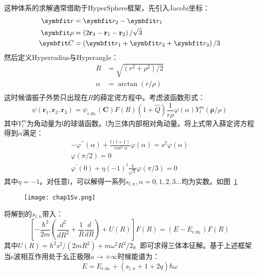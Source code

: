 这种体系的求解通常借助于HyperSphere框架，先引入Jacobi坐标：
\begin{equation}
\begin{split}
\Vector{r}&=\Vector{r}_{2}-\Vector{r}_{1}\\
\boldsymbol{\rho}&=\left(2 \mathbf{r}_{3}-\mathbf{r}_{1}-\mathbf{r}_{2}\right) / \sqrt{3}\\
\Vector{C}&=\left(\Vector{r}_{1}+\Vector{r}_{2}+\Vector{r}_{3}\right) / 3\\
\end{split}
\end{equation}
然后定义Hyperradius与Hyperangle：
\begin{equation}
\begin{split}
R&=\sqrt{\left(r^{2}+\rho^{2}\right) / 2}\\
\alpha&=\arctan (r / \rho)\\
\end{split}
\end{equation}
这时候谐振子外势只出现在$R$的薛定谔方程中。考虑波函数形式：
\begin{equation}
\psi\left(\mathbf{r}_{1}, \mathbf{r}_{2}, \mathbf{r}_{3}\right)=\psi_{\mathrm{c} . \mathrm{m} .}(\mathbf{C}) F(R)(1+\hat{Q}) \frac{1}{r \rho} \varphi(\alpha) Y_{l}^{m}(\boldsymbol{\rho} / \rho)
\end{equation}
其中$Y_l^m$为角动量为l的球谐函数。l为三体内部相对角动量。将上式带入薛定谔方程得到$\alpha$满足：
\begin{equation}
\begin{gathered}
-\varphi^{\prime \prime}(\alpha)+\frac{l(l+1)}{\cos ^{2} \alpha} \varphi(\alpha)=s^{2} \varphi(\alpha) \\
\varphi(\pi / 2)=0 \\
\varphi^{\prime}(0)+\eta(-1)^{l} \frac{4}{\sqrt{3}} \varphi(\pi / 3)=0
\end{gathered}
\end{equation}
其中$\eta=-1$。对任意l，可以解得一系列$s_{l,n},n=0,1,2,3...$均为实数。如图~\ref{Sv}
\begin{figure}[!htbp]
    \centering
    \texttt{[image: chap1Sv.png]}
    \label{Sv}
\end{figure}
将解到的$s_{l,n}$带入：
\begin{equation}
\left[-\frac{\hbar^{2}}{2 m}\left(\frac{d^{2}}{d R^{2}}+\frac{1}{R} \frac{d}{d R}\right)+U(R)\right] F(R)=\left(E-E_{\mathrm{c} . \mathrm{m} .}\right) F(R)
\end{equation}
其中$U(R)=\hbar^{2} s^{2} /\left(2 m R^{2}\right)+m \omega^{2} R^{2} / 2$。即可求得三体本征解。基于上述框架当s波相互作用处于幺正极限$a\to+\infty$时候能谱为：
\begin{equation}
E=E_{\mathrm{c} . \mathrm{m} .}+\left(s_{l, n}+1+2 q\right) \hbar \omega
\end{equation}

